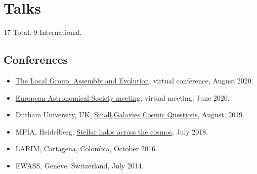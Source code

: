\documentclass[UTF8]{article}
\begin{document}
\section*{Talks}

17 Total, 9 International.

\subsection*{Conferences}

\begin{itemize}
  \setlength\itemsep{0.0em}
  \renewcommand\labelitemi{$\cdot$}

 \item
 \href{https://www.stsci.edu/contents/events/stsci/2020/april/the-local-group-assembly-and-evolution?page=2&filterUUID=6fedb8a7-}{The Local Group: Assembly and Evolution}, virtual conference, August 2020.
\item \href{https://eas.unige.ch/EAS2020/}{European Astronomical Society meeting}, virtual meeting, June 2020.
\item Durham University, UK, \href{http://astro.dur.ac.uk/cosmodwarfs/}{Small Galaxies Cosmic Questions}, August, 2019.
\item MPIA, Heidelberg, \href{http://www.mpia.de/homes/stellarhalos2018-loc/sh2018/index.html}{Stellar halos across the cosmos}, July 2018.
\item LARIM, Cartagena, Colombia, October 2016.
\item EWASS, Geneve, Switzerland, July 2014.
\end{itemize}
  
\end{document}
